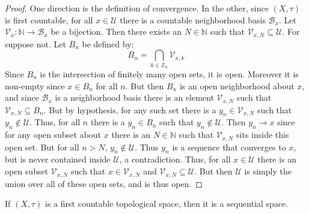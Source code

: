 \documentclass{article}                                                        %
\begin{document}
        \begin{proof}
            One direction is the definition of convergence. In the other, since
            $(X,\tau)$ is first countable, for all $x\in\mathcal{U}$ there is a
            countable neighborhood basis $\mathcal{B}_{x}$. Let
            $\mathcal{V}_{x}:\mathbb{N}\rightarrow\mathcal{B}_{x}$ be a
            bijection. Then there exists an $N\in\mathbb{N}$ such that
            $\mathcal{V}_{x,N}\subseteq\mathcal{U}$. For suppose not. Let
            $B_{n}$ be defined by:
            \begin{equation}
                B_{n}=\bigcap_{k\in\mathbb{Z}_{n}}\mathcal{V}_{x,k}
            \end{equation}
            Since $B_{n}$ is the intersection of finitely many open sets, it is
            open. Moreover it is non-empty since $x\in{B}_{n}$ for all $n$.
            But then $B_{n}$ is an open neighborhood about $x$, and since
            $\mathcal{B}_{x}$ is a neighborhood basis there is an element
            $\mathcal{V}_{x,N}$ such that $\mathcal{V}_{x,N}\subseteq{B}_{n}$.
            But by hypothesis, for any such set there is a
            $y_{n}\in\mathcal{V}_{x,N}$ such that $y_{n}\notin\mathcal{U}$.
            Thus, for all $n$ there is a $y_{n}\in{B}_{n}$ such that
            $y_{n}\notin\mathcal{U}$. Then $y_{n}\rightarrow{x}$ since for any
            open subset about $x$ there is an $N\in\mathbb{N}$ such that
            $\mathcal{V}_{x,N}$ sits inside this open set. But for all $n>N$,
            $y_{n}\notin\mathcal{U}$. Thus $y_{n}$ is a sequence that
            converges to $x$, but is never contained inside $\mathcal{U}$,
            a contradiction. Thus, for all $x\in\mathcal{U}$ there is an open
            subset $\mathcal{V}_{x,N}$ such that $x\in\mathcal{V}_{x,N}$ and
            $\mathcal{V}_{x,N}\subseteq\mathcal{U}$. But then $\mathcal{U}$ is
            simply the union over all of these open sets, and is thus open.
        \end{proof}
        \begin{theorem}
            If $(X,\tau)$ is a first countable topological space, then it is
            a sequential space.
        \end{theorem}
\end{document}
